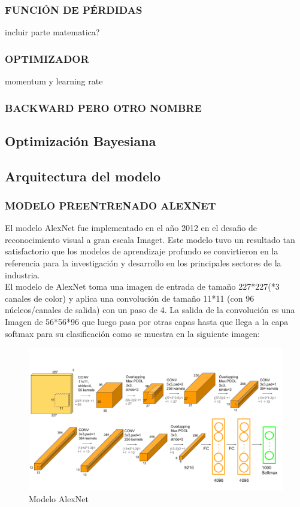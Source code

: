 			\subsubsection{FUNCIÓN DE PÉRDIDAS}
			
			
			incluir parte matematica?
			\subsubsection{\MakeUppercase{Optimizador}}
			
			
			momentum y learning rate
			\subsubsection{\MakeUppercase{Backward pero otro nombre}}
			
			
		\subsection{Optimización Bayesiana}	
			
			
		\subsection{Arquitectura del modelo}
			\subsubsection{\MakeUppercase{Modelo preentrenado ALEXNET}}
			El modelo AlexNet fue implementado en el año 2012 en el desafio de reconocimiento visual a gran escala Imaget. Este modelo tuvo un resultado tan satisfactorio que los modelos de aprendizaje profundo se convirtieron en la referencia para la investigación y desarrollo en los principales sectores de la industria. \cite{Pytorch}
			\\
			El modelo de AlexNet toma una imagen de entrada de tamaño 227*227(*3 canales de color) y aplica una convolución de tamaño 11*11 (con 96 núcleos/canales de salida) con un paso de 4. La salida de la convolución es una Imagen de 56*56*96 que luego pasa por otras capas hasta que llega a la capa softmax para su clasificación como se muestra en la siguiente imagen:
			
			\begin{figure}[ht]
				\centering
				\includegraphics[scale=0.4]{Figs/5.png}
				\caption{Modelo AlexNet}
				\label{fig:AlexNet}
			\end{figure}
		
